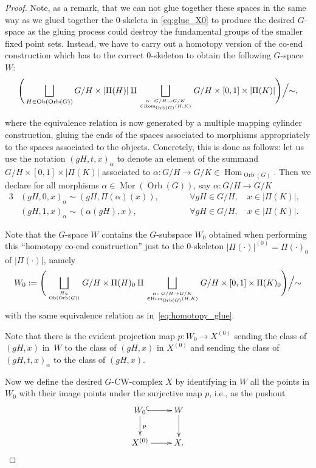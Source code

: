 \documentclass[pdftex]{sigma}
\numberwithin{equation}{section}
\newcommand{\disjointunion}{\amalg}
\DeclareMathOperator{\Hom}{Hom} %
\newcommand{\bigdisjointunion}{\bigsqcup}
\DeclareMathOperator{\Orb}{Orb}
\begin{document}
\begin{proof}
		Note, as a remark, that we can not glue together these spaces in the same
		way as we glued together the 0-skeleta in \eqref{eq:glue_X0} to produce the
		desired $G$-space as the gluing process could destroy the fundamental
		groups of the smaller fixed point sets. Instead, we have to carry out a homotopy version of the co-end
		construction which has to the correct $0$-skeleton to obtain the following $G$-space $W$:
		\[%
			\Bigg(\bigdisjointunion_{H\in \operatorname{Ob}(\Orb(G))} G/H \times |\Pi(H)|\disjointunion
			\bigdisjointunion_{\alpha\colon G/H\to G/K \atop \in \Hom_{\Orb(G)}(H,K)} G/H\times [0,1] \times |\Pi(K)|\Bigg) \Big{/}{\sim},
		\]
		where the equivalence relation is now generated by a multiple mapping cylinder
		construction, gluing the ends of the spaces associated to morphisms
		appropriately to the spaces associated to the objects. Concretely, this is
		done as follows: let us use the
		notation $(gH,t,x)_\alpha$ to denote an element of the summand $G/H\times
		[0,1]\times |\Pi(K)|$ associated to $\alpha\colon G/H\to G/K\in
		\Hom_{\Orb(G)}$. Then we declare for all morphisms
		$\alpha\in \operatorname{Mor}(\Orb(G))$, say $\alpha\colon G/H\to G/K$
		\begin{alignat}{3}
				&(gH,0, x)_\alpha \sim (gH,\Pi(\alpha)(x)),\qquad&&\forall gH\in G/H,\quad x\in |\Pi(K)|,&\nonumber\\
				&(gH,1,x)_\alpha \sim (\alpha(gH),x), \qquad&&\forall gH\in G/H,\quad x\in |\Pi(K)|.&\label{eq:homotopy_glue}
		\end{alignat}
		
		Note that the $G$-space $W$ contains the $G$-subspace $W_0$ obtained when
		performing this ``homotopy co-end construction'' just to the 0-skeleton
		$|\Pi(\cdot)|^{(0)}=\Pi(\cdot)_0$ of $|\Pi(\cdot)|$, namely{\samepage
		\begin{equation*}
			W_0:= \Bigg(\bigdisjointunion_{H\in \atop \operatorname{Ob}(\Orb(G))} G/H \times \Pi(H)_0\disjointunion
			\bigdisjointunion_{\alpha\colon G/H\to G/K\atop\in \Hom_{\Orb(G)}(H,K)} G/H\times [0,1] \times \Pi(K)_0\Bigg) \Big{/}{\sim}
		\end{equation*}
		with the same equivalence relation as in~\eqref{eq:homotopy_glue}.}
		
		Note that there is the evident projection map $p\colon W_0\to X^{(0)}$ sending
		the class of $(gH,x)$ in~$W$ to the class of $(gH,x)$ in $X^{(0)}$ and sending
		the class of $(gH,t,x)_\alpha$ to the class of $(gH,x)$.
		
		Now we define the desired $G$-CW-complex $X$ by identifying in $W$ all the
		points in $W_0$ with their image points under the surjective map $p$, i.e., as
		the pushout
		\begin{equation*}
			\xymatrix{W_0\ar@{^{(}->}[r]\ar[d]^p & W\ar[d]\\
				X^{(0)}\ar[r]& X.}
		\end{equation*}
		

\end{proof}
\end{document}
